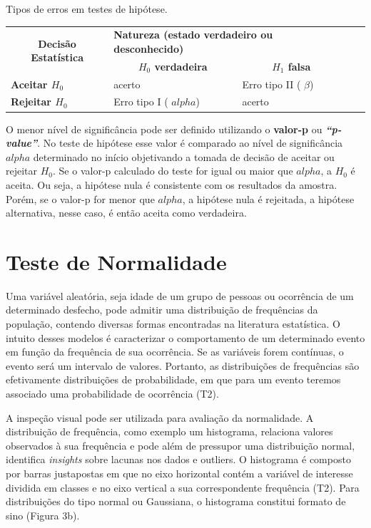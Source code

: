 \begin{quadro}[!htb]
	\centering
	\caption{Tipos de erros em testes de hipótese.\label{qua:hipotese}}
	\begin{tabular}{|l|l|l|ll}
		\cline{1-3}
\multicolumn{1}{|c|}{\multirow{2}{*}{\textbf{Decisão Estatística}}} & \multicolumn{2}{l|}{\textbf{Natureza (estado verdadeiro ou desconhecido)}} &  &  \\ \cline{2-3}
\multicolumn{1}{|c|}{} & \multicolumn{1}{c|}{\textbf{$H_0$ verdadeira}} & \multicolumn{1}{c|}{\textbf{$H_1$ falsa}} &  &  \\ \cline{1-3}
\textbf{Aceitar $H_0$} & acerto & Erro tipo II ( \ensuremath{\beta}) &  &  \\ \cline{1-3}
\textbf{Rejeitar $H_0$} & Erro tipo I ( \ensuremath{alpha}) & acerto &  &  \\ \cline{1-3}
	\end{tabular}
	\fonte{\citeonline{}}
\end{quadro}

O menor nível de significância pode ser definido utilizando o \textbf{valor-p} ou \textbf{\textit{“p-value”}}. No teste de hipótese esse valor é comparado ao nível de significância \ensuremath{alpha} determinado no início objetivando a tomada de decisão de aceitar ou rejeitar $H_0$. Se o valor-p calculado do teste for igual ou maior que \ensuremath{alpha}, a $H_0$ é aceita. Ou seja, a hipótese nula é consistente com os resultados da amostra. Porém, se o valor-p for menor que \ensuremath{alpha}, a hipótese nula é rejeitada, a hipótese alternativa, nesse caso, é então aceita como verdadeira.

\section{Teste de Normalidade}
Uma variável aleatória, seja idade de um grupo de pessoas ou ocorrência de um determinado desfecho, pode admitir uma distribuição de frequências da população, contendo diversas formas encontradas na literatura estatística. O intuito desses modelos é caracterizar o comportamento de um determinado evento em função da frequência de sua ocorrência. Se as variáveis forem contínuas, o evento será um intervalo de valores. Portanto, as distribuições de frequências são efetivamente distribuições de probabilidade, em que para um evento teremos associado uma probabilidade de ocorrência (T2). 

A inspeção visual pode ser utilizada para avaliação da normalidade. A distribuição de frequência, como exemplo um histograma, relaciona valores observados à sua frequência e pode além de pressupor uma distribuição normal, identifica \textit{insights} sobre lacunas nos dados e outliers. O histograma é composto por barras justapostas em que no eixo horizontal contém a variável de interesse dividida em classes e no eixo vertical a sua correspondente frequência (T2). Para distribuições do tipo normal ou Gaussiana, o histograma constitui formato de sino (Figura 3b).

